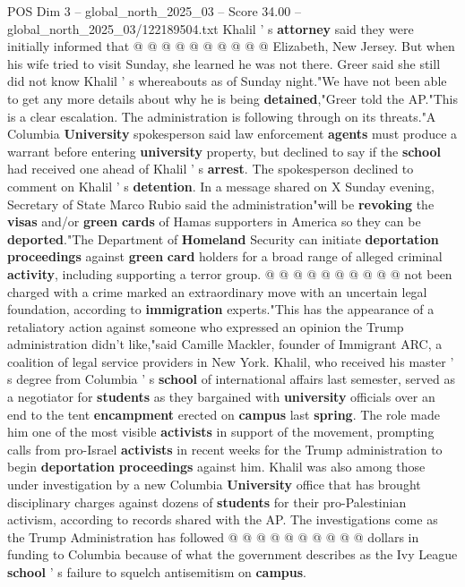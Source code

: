 \begin{textsample}{POS Dim 3 – global\_north\_2025\_03 – Score 34.00 – global\_north\_2025\_03/122189504.txt}
Khalil ' s \textbf{attorney} said they were initially informed that @ @ @ @ @ @ @ @ @ @ Elizabeth, New Jersey.
But when his wife tried to visit Sunday, she learned he was not there.
Greer said she still did not know Khalil ' s whereabouts as of Sunday night."We have not been able to get any more details about why he is being \textbf{detained},"Greer told the AP."This is a clear escalation.
The administration is following through on its threats."A Columbia \textbf{University} spokesperson said law enforcement \textbf{agents} must produce a warrant before entering \textbf{university} property, but declined to say if the \textbf{school} had received one ahead of Khalil ' s \textbf{arrest}.
The spokesperson declined to comment on Khalil ' s \textbf{detention}.
In a message shared on X Sunday evening, Secretary of State Marco Rubio said the administration"will be \textbf{revoking} the \textbf{visas} and/or \textbf{green} \textbf{cards} of Hamas supporters in America so they can be \textbf{deported}."The Department of \textbf{Homeland} Security can initiate \textbf{deportation} \textbf{proceedings} against \textbf{green} \textbf{card} holders for a broad range of alleged criminal \textbf{activity}, including supporting a terror group. @ @ @ @ @ @ @ @ @ @ not been charged with a crime marked an extraordinary move with an uncertain legal foundation, according to \textbf{immigration} experts."This has the appearance of a retaliatory action against someone who expressed an opinion the Trump administration didn't like,"said Camille Mackler, founder of Immigrant ARC, a coalition of legal service providers in New York.
Khalil, who received his master ' s degree from Columbia ' s \textbf{school} of international affairs last semester, served as a negotiator for \textbf{students} as they bargained with \textbf{university} officials over an end to the tent \textbf{encampment} erected on \textbf{campus} last \textbf{spring}.
The role made him one of the most visible \textbf{activists} in support of the movement, prompting calls from pro-Israel \textbf{activists} in recent weeks for the Trump administration to begin \textbf{deportation} \textbf{proceedings} against him.
Khalil was also among those under investigation by a new Columbia \textbf{University} office that has brought disciplinary charges against dozens of \textbf{students} for their pro-Palestinian activism, according to records shared with the AP.
The investigations come as the Trump Administration has followed @ @ @ @ @ @ @ @ @ @ dollars in funding to Columbia because of what the government describes as the Ivy League \textbf{school} ' s failure to squelch antisemitism on \textbf{campus}.

\end{textsample}
